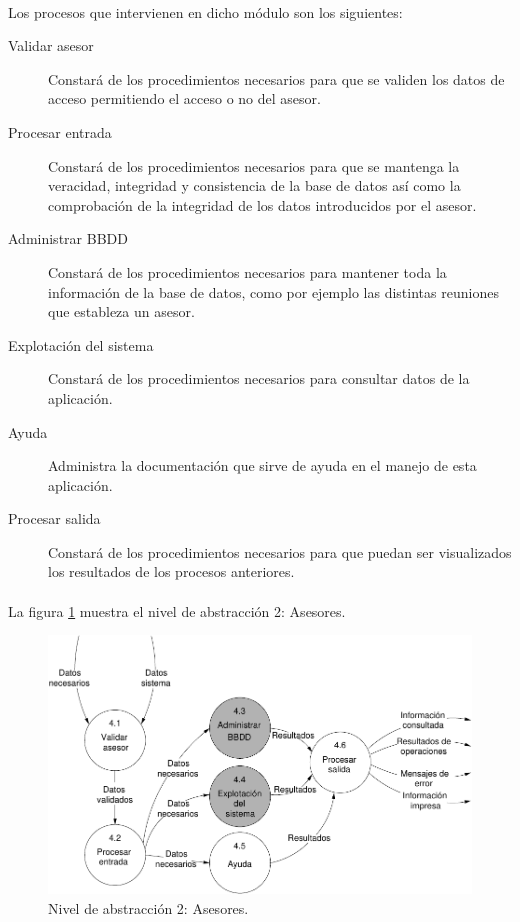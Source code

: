\paragraph{}Los procesos que intervienen en dicho módulo son los siguientes:

\begin{description}
 \item[Validar asesor] Constará de los procedimientos necesarios para que se
      validen los datos de acceso permitiendo el acceso o no del asesor.
 \item[Procesar entrada] Constará de los procedimientos necesarios para que se
      mantenga la veracidad, integridad y consistencia de la base de datos así
      como la comprobación de la integridad de los datos introducidos por el
      asesor.
 \item[Administrar BBDD] Constará de los procedimientos necesarios para mantener
      toda la información de la base de datos, como por ejemplo las distintas
      reuniones que estableza un asesor.
 \item[Explotación del sistema]  Constará de los procedimientos necesarios para
      consultar datos de la aplicación.
 \item[Ayuda] Administra la documentación que sirve de ayuda en el manejo de
      esta aplicación.
 \item[Procesar salida] Constará de los procedimientos necesarios para que
      puedan ser visualizados los resultados de los procesos anteriores.
\end{description}

\paragraph{}La figura \ref{diagramaNivel2-Asesores} muestra el nivel de
abstracción 2: Asesores.

  \begin{figure}[!ht]
    \begin{center}
      \includegraphics[]{08.Analisis_Funcional/8.2.DFDs/Niveles/Nivel2/Diagramas/nivel2-Asesores.pdf}
      \caption{Nivel de abstracción 2: Asesores.}
      \label{diagramaNivel2-Asesores}
    \end{center}
  \end{figure}